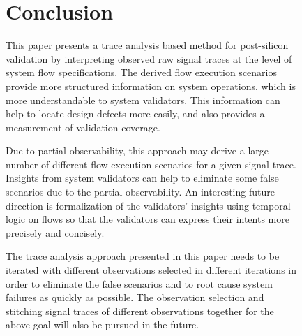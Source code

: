 \documentclass[conference]{IEEEtran}
\begin{document}
\begin{figure}
%
\section{Conclusion}

This paper presents a trace analysis based method for post-silicon validation by interpreting observed raw signal traces at the level of system flow specifications.  The derived flow execution scenarios provide more structured information on system operations, which is more understandable to system validators.   This information can help to locate design defects more easily, and also provides a measurement of validation coverage.  

Due to partial observability, this approach may derive a large number of different flow execution scenarios for a given signal trace.  Insights from system validators can help to eliminate some false scenarios due to the partial observability.  An interesting future direction is formalization of the validators' insights using temporal logic on flows so that the validators can express their intents more precisely and concisely. 

The trace analysis approach presented in this paper needs to be iterated with different observations selected in different iterations in order to eliminate the false scenarios and to root cause system failures as quickly as possible.  The observation selection and stitching signal traces of different observations together for the above goal will also be pursued in the future.






%
%
%







\end{figure}
\end{document}
